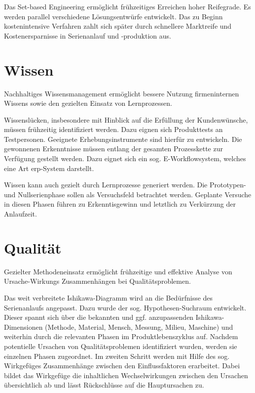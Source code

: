Das Set-based Engineering ermöglicht frühzeitiges Erreichen hoher Reifegrade. Es werden parallel verschiedene Lösungsentwürfe entwickelt. Das zu Beginn kostenintensive Verfahren zahlt sich später durch schnellere Marktreife und Kostenersparnisse in Serienanlauf und -produktion aus. 

\section{Wissen}

Nachhaltiges Wissensmanagement ermöglicht bessere Nutzung firmeninternen Wissens sowie den gezielten Einsatz von Lernprozessen. 

Wissenslücken, insbesondere mit Hinblick auf die Erfüllung der Kundenwünsche, müssen frühzeitig identifiziert werden. Dazu eignen sich Produkttests an Testpersonen. Geeignete Erhebungsinstrumente sind hierfür zu entwickeln. Die gewonnenen Erkenntnisse müssen entlang der gesamten Prozesskette zur Verfügung gestellt werden. Dazu eignet sich ein sog. E-Workflowsystem, welches eine Art \gls{erp}-System darstellt. 

Wissen kann auch gezielt durch Lernprozesse generiert werden. Die Prototypen- und Nullserienphase sollen als Versuchsfeld betrachtet werden. Geplante Versuche in diesen Phasen führen zu Erkenntisgewinn und letztlich zu Verkürzung der Anlaufzeit. 

\section{Qualität}

Gezielter Methodeneinsatz ermöglicht frühzeitige und effektive Analyse von Ursache-Wirkungs %
Zusammenhängen bei Qualitätsproblemen. 

Das weit verbreitete Ishikawa-Diagramm wird an die Bedürfnisse des Serienanlaufs angepasst. Dazu wurde der sog. Hypothesen-Suchraum entwickelt. Dieser spannt sich über die bekannten und ggf. anzupassenden Ishikawa-Dimensionen (Methode, Material, Mensch, Messung, Milieu, Maschine) und weiterhin durch die relevanten Phasen im Produktlebenszyklus auf. Nachdem potentielle Ursachen  von Qualitätsproblemen identifiziert wurden, werden sie einzelnen Phasen zugeordnet. Im zweiten Schritt werden mit Hilfe des sog. Wirkgefüges Zusammenhänge zwischen den Einflussfaktoren erarbeitet. Dabei bildet das Wirkgefüge die inhaltlichen Wechselwirkungen zwischen den Ursachen übersichtlich ab und lässt Rückschlüsse auf die Hauptursachen zu.

